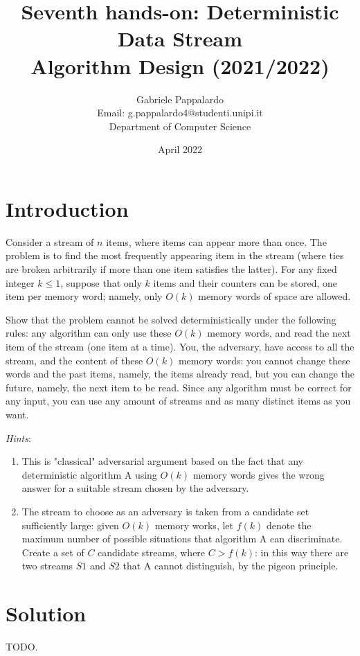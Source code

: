 \documentclass{article}
\title{Seventh hands-on: Deterministic Data Stream \\[1ex] \large Algorithm Design (2021/2022)}
\author{Gabriele Pappalardo\\Email: g.pappalardo4@studenti.unipi.it\\Department of Computer Science}
\date{April 2022}
\begin{document}
\maketitle

\section{Introduction}

Consider a stream of $n$ items, where items can appear more than once. The problem is to find the most frequently appearing item in the stream (where ties are broken arbitrarily if more than one item satisfies the latter). 
For any fixed integer $k \le 1$, suppose that only $k$ items and their counters can be stored, one item per memory word; namely, 
only $O(k)$ memory words of space are allowed. 
\newline

\noindent Show that the problem cannot be solved deterministically under the following rules: any algorithm can only use these $O(k)$ memory words, and read the next item of the stream (one item at a time). 
You, the adversary, have access to all the stream, and the content of these $O(k)$ memory words: 
you cannot change these words and the past items, namely, the items already read, but you can change the future, 
namely, the next item to be read. Since any algorithm must be correct for any input, you can use any amount of streams and as many distinct items as you want.  
\newline

\noindent \textit{Hints}:
\begin{enumerate}
    \item This is "classical" adversarial argument based on the fact that any deterministic algorithm A using $O(k)$ memory words gives the wrong answer for a suitable stream chosen by the adversary. 
    \item The stream to choose as an adversary is taken from a candidate set sufficiently large: given $O(k)$ memory works, let $f(k)$ denote the maximum number of possible situations that algorithm A can discriminate. Create a set of $C$ candidate streams, where $C > f(k)$: in this way there are two streams $S1$ and $S2$ that A cannot distinguish, by the pigeon principle. 
\end{enumerate}

\section{Solution}

TODO.
\end{document}
